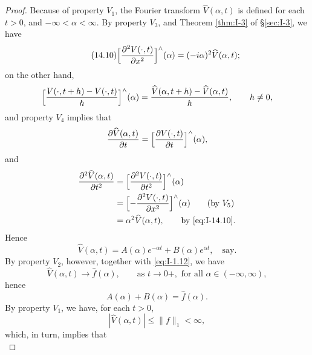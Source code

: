 \begin{proof}
Because of property $V_1$, the Fourier transform $\widehat V(\alpha,t)$ is defined for each $t>0$, and $-\infty<\alpha<\infty$. By property $V_3$, and Theorem \ref{thm:I-3} of \S\ref{sec:I-3}, we have
\begin{equation}\label{eq:I-14.10}\tag{14.10}
\Bigl[\frac{\partial^{2}V(\cdot,t)}{\partial x^{2}}\Bigr]^{\wedge}(\alpha)=(-i\alpha)^{2}\widehat V(\alpha,t);
\end{equation}
on the other hand,
\begin{equation*}
\Bigl[\frac{V(\cdot,t+h)-V(\cdot,t)}{h}\Bigr]^{\wedge}(\alpha)
=\frac{\widehat V(\alpha,t+h)-\widehat V(\alpha,t)}{h},\qquad h\neq 0,
\end{equation*}
and property $V_4$ implies that
\begin{equation*}
\frac{\partial\widehat V(\alpha,t)}{\partial t}
=\Bigl[\frac{\partial V(\cdot,t)}{\partial t}\Bigr]^{\wedge}(\alpha),
\end{equation*}
and
\begin{equation*}
\begin{aligned}
\frac{\partial^{2}\widehat V(\alpha,t)}{\partial t^{2}} &= \Bigl[\frac{\partial^{2}V(\cdot,t)}{\partial t^{2}}\Bigr]^{\wedge}(\alpha)\\
&= \Bigl[-\frac{\partial^{2}V(\cdot,t)}{\partial x^{2}}\Bigr]^{\wedge}(\alpha)\qquad\text{(by }V_5)\\
&= \alpha^{2}\widehat V(\alpha,t),\qquad\text{by \eqref{eq:I-14.10}}.
\end{aligned}
\end{equation*}
Hence
\begin{equation}\label{eq:I-14.11}\tag{14.11}
\widehat V(\alpha,t)=A(\alpha)e^{-\alpha t}+B(\alpha)e^{\alpha t},\quad\text{say}.
\end{equation}
By property $V_2$, however, together with \eqref{eq:I-1.12}, we have
\begin{equation*}
\widehat V(\alpha,t)\to\widehat f(\alpha),\qquad\text{as }t\to 0+,\text{ for all }\alpha\in(-\infty,\infty),
\end{equation*}
hence
\begin{equation*}
A(\alpha)+B(\alpha)=\widehat f(\alpha).
\end{equation*}
By property $V_1$, we have, for each $t>0$,
\begin{equation*}
|\widehat V(\alpha,t)|\le\|f\|_1<\infty,
\end{equation*}
which, in turn, implies that
\begin{equation*}

\end{equation*}
\end{proof}

